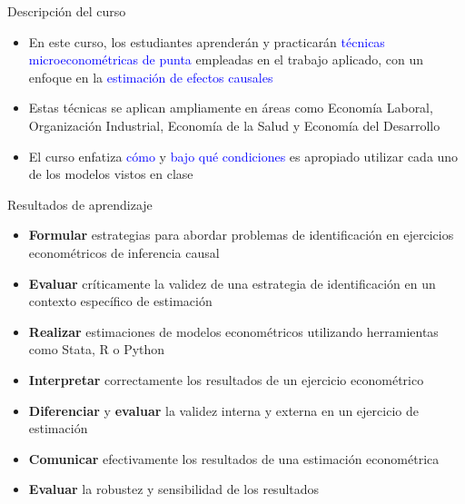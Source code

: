 \documentclass[10pt, xcolor=dvipsnames]{beamer}
\begin{document}
\begin{frame}{Descripción del curso}
\begin{itemize}
	\item En este curso, los estudiantes aprenderán y practicarán \textcolor{blue}{técnicas microeconométricas de punta} empleadas en el trabajo aplicado, con un enfoque en la \textcolor{blue}{estimación de efectos causales}%
	\item Estas técnicas se aplican ampliamente en áreas como Economía Laboral, Organización Industrial, Economía de la Salud y Economía del Desarrollo%
	\item El curso enfatiza \textcolor{blue}{cómo} y \textcolor{blue}{bajo qué condiciones} es apropiado utilizar cada uno de los modelos vistos en clase
\end{itemize}
\end{frame}


\begin{frame}{Resultados de aprendizaje}
\begin{itemize}
    \item[1.] \textbf{Formular} estrategias para abordar problemas de identificación en ejercicios econométricos de inferencia causal %
    
    \item[2.] \textbf{Evaluar} críticamente la validez de una estrategia de identificación en un contexto específico de estimación%
    
    \item[3.] \textbf{Realizar} estimaciones de modelos econométricos utilizando herramientas como Stata, R o Python%
    
    \item[4.] \textbf{Interpretar} correctamente los resultados de un ejercicio econométrico%

     \item[5.] \textbf{Diferenciar} y \textbf{evaluar} la validez interna y externa en un ejercicio de estimación%
    
    \item[6.] \textbf{Comunicar} efectivamente los resultados de una estimación econométrica%
    
    \item[7.] \textbf{Evaluar} la robustez y sensibilidad de los resultados
\end{itemize}
\end{frame}
\end{document}
